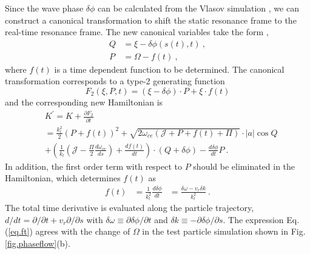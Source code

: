 Since the wave phase $\delta \phi$ can be calculated from the Vlasov simulation
 \cite{zheng2024}, we can construct a canonical transformation to shift the static resonance frame to the real-time resonance frame.
The new canonical variables take the form \cite{berk1999},
\begin{equation}\label{eq.ct}
    \begin{aligned}
        Q &= \xi - \delta \phi(s(t),t)~,
        \\
        P & = \Omega - f(t)~,
    \end{aligned}
\end{equation}
where $f(t)$ is a time dependent function to be determined.
The canonical  transformation corresponds to a type-2 generating function \cite{goldstein2001}
\begin{equation}
    F_2(\xi,P,t) = (\xi - \delta \phi) \cdot P + \xi \cdot f(t)
\end{equation}
and the corresponding new Hamiltonian  is
\begin{equation}
    \begin{aligned}
        &  K^\prime = K + \frac{\partial F_2}{\partial t}
        \\
        & = \frac{k_l^2}{2}(P+f(t))^2 
        + \sqrt{2\omega_{ce}(\mathcal{J}+P+f(t)+\Pi)} \cdot |a|\cos Q 
        \\
        & + \left(\frac{1}{k_l}\left(\mathcal{J} - \frac{\Pi}{2} \frac{d\omega_{ce}}{ds}\right)  +\frac{d f(t)}{d t} \right)\cdot(Q + \delta \phi)  - \frac{d \delta \phi}{d t} P ~. 
        \end{aligned}
\end{equation}
In addition,  the first order term with respect to $P$  should be eliminated in the  Hamiltonian, which determines $f(t)$ as
\begin{equation}\label{eq.ft}
    \begin{aligned}
    f(t) & = \frac{1}{k_l^2} \frac{d \delta \phi}{d t}  &= \frac{\delta \omega - v_r \delta k}{k_l^2}~.
    \end{aligned}
\end{equation} 
The total time derivative is evaluated along the particle trajectory, $d/dt = \partial/\partial t + v_r \partial /\partial s$ with $\delta \omega  \equiv \partial \delta \phi/\partial t$ and $\delta k  \equiv -\partial \delta \phi/\partial s$.
The expression Eq. (\ref{eq.ft}) agrees with the change of $\Omega$ in the test particle simulation shown in Fig. \ref{fig.phaseflow}(b).

